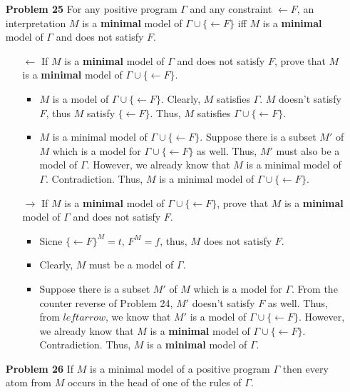 \documentclass[12pt]{article}
\begin{document}
\begin{enumerate}
\item[\textbf{Problem 25}] For any positive program $\Gamma$ and any constraint $\leftarrow F$, an interpretation $M$ is a \textbf{minimal} model of $\Gamma \cup \{\leftarrow F \}$ iff $M$ is a \textbf{minimal} model of $\Gamma$ and does not satisfy $F$. 
\begin{itemize}
    \item[$\leftarrow$] If $M$ is a \textbf{minimal} model of $\Gamma$ and does not satisfy $F$, prove that $M$ is a \textbf{minimal} model of $\Gamma \cup \{\leftarrow F \}$.
     \begin{itemize}
         \item $M$ is a model of $\Gamma \cup \{\leftarrow F \}$. Clearly, $M$ satisfies $\Gamma$. $M$ doesn't satisfy $F$, thus $M$ satisfy $\{\leftarrow F \}$. Thus,  $M$ satisfies $\Gamma \cup \{\leftarrow F \}$.
         \item $M$ is a minimal model of $\Gamma \cup \{\leftarrow F \}$. Suppose there is a subset $M'$ of $M$ which is a model for $\Gamma \cup \{\leftarrow F \}$ as well. Thus, $M'$ must also be a model of $\Gamma$. However, we already know that $M$ is a minimal model of $\Gamma$. Contradiction. Thus, $M$ is a minimal model of $\Gamma \cup \{\leftarrow F \}$. 
     \end{itemize}
     \item[$\rightarrow$] If $M$ is a \textbf{minimal} model of $\Gamma \cup \{\leftarrow F \}$, prove that $M$ is a \textbf{minimal} model of $\Gamma$ and does not satisfy $F$. 
     \begin{itemize}
         \item Sicne $\{\leftarrow F \}^M = t$, $F^M = f$, thus, $M$ does not satisfy $F$.
         \item Clearly, $M$ must be a model of $\Gamma$. 
         \item Suppose there is a subset $M'$ of $M$ which is a model for $\Gamma$. From the counter reverse of Problem 24, $M'$ doesn't satisfy $F$ as well. Thus, from $leftarrow$, we know that $M'$ is a model of $\Gamma \cup \{\leftarrow F \}$. However, we already know that $M$ is a \textbf{minimal} model of $\Gamma \cup \{\leftarrow F \}$. Contradiction. Thus, $M$ is a \textbf{minimal} model of $\Gamma$. 
     \end{itemize}
\end{itemize}



\item[\textbf{Problem 26}] If $M$ is a minimal model of a positive program $\Gamma$ then every atom from $M$ occurs in the head of one of the rules of $\Gamma$. 


\end{enumerate}
\end{document}
